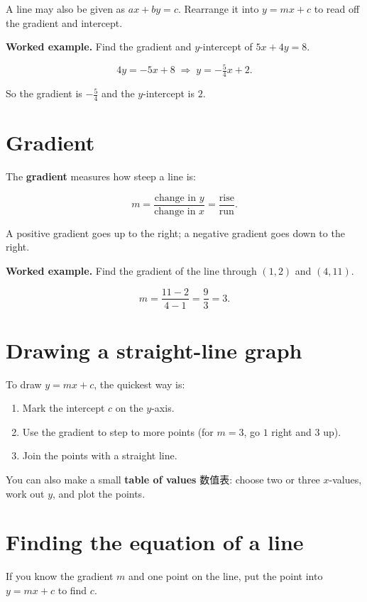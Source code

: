 \documentclass[11pt]{article}
\begin{document}
A line may also be given as $ax + by = c$. Rearrange it into $y = mx + c$ to read off the gradient and intercept.

\textbf{Worked example.} Find the gradient and $y$-intercept of $5x + 4y = 8$.

\[
4y = -5x + 8 \;\Rightarrow\; y = -\tfrac{5}{4}x + 2.
\]

So the gradient is $-\tfrac{5}{4}$ and the $y$-intercept is $2$.

\section*{Gradient}

The \textbf{gradient} measures how steep a line is:

\[
m = \frac{\text{change in } y}{\text{change in } x} = \frac{\text{rise}}{\text{run}}.
\]

A positive gradient goes up to the right; a negative gradient goes down to the right.

\textbf{Worked example.} Find the gradient of the line through $(1, 2)$ and $(4, 11)$.

\[
m = \frac{11 - 2}{4 - 1} = \frac{9}{3} = 3.
\]

\section*{Drawing a straight-line graph}

To draw $y = mx + c$, the quickest way is:

\begin{enumerate}
\item Mark the intercept $c$ on the $y$-axis.

\item Use the gradient to step to more points (for $m = 3$, go $1$ right and $3$ up).

\item Join the points with a straight line.

\end{enumerate}

You can also make a small \textbf{table of values} 数值表: choose two or three $x$-values, work out $y$, and plot the points.

\section*{Finding the equation of a line}

If you know the gradient $m$ and one point on the line, put the point into $y = mx + c$ to find $c$.
\end{document}
